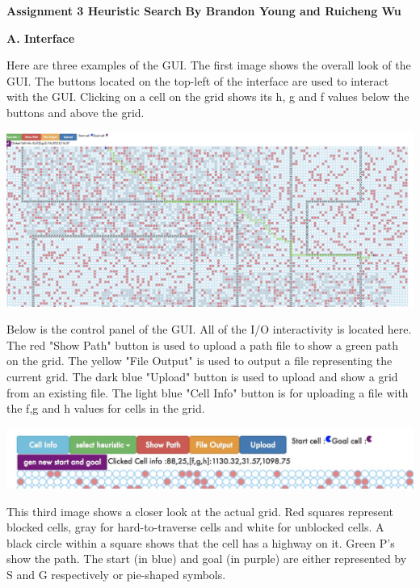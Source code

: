 \documentclass[12pt, letterpaper]{article}
\begin{document}
\noindent \textbf{\large Assignment 3 Heuristic Search }\newline
\noindent \textbf{By Brandon Young and Ruicheng Wu}

\bigskip

\noindent \textbf{A. Interface}

Here are three examples of the GUI. The first image shows the overall look of the GUI. The buttons located on the top-left of the interface are used to interact with the GUI. Clicking on a cell on the grid shows its h, g and f values below the buttons and above the grid. 

\medskip

\includegraphics[scale=0.30]{"a-map1-0"}

\medskip 

Below is the control panel of the GUI. All of the I/O interactivity is located here. The red "Show Path" button is used to upload a path file to show a green path on the grid. The yellow "File Output" is used to output a file representing the current grid. The dark blue "Upload" button is used to upload and show a grid from an existing file. The light blue "Cell Info" button is for uploading a file with the f,g and h values for cells in the grid.

\medskip

\includegraphics[scale=0.4]{"control-panel"}

\medskip

This third image shows a closer look at the actual grid. Red squares represent blocked cells, gray for hard-to-traverse cells and white for unblocked cells. A black circle within a square shows that the cell has a highway on it. Green P's show the path. The start (in blue) and goal (in purple) are either represented by S and G respectively or pie-shaped symbols.
\end{document}
